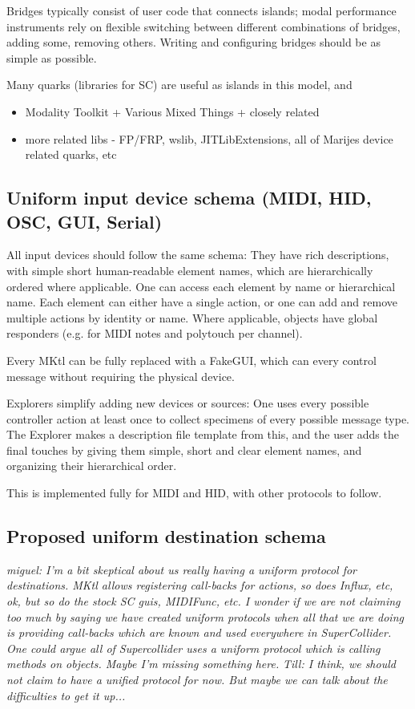\documentclass{article}
\begin{document}
Bridges typically consist of user code that connects islands; modal performance instruments rely on flexible switching between different combinations of bridges, adding some, removing others. Writing and configuring bridges should be as simple as possible. 

Many quarks (libraries for SC) are useful as islands in this model, and 

\begin{itemize}
	\item Modality Toolkit + Various Mixed Things + closely related
	\item more related libs - FP/FRP, wslib, JITLibExtensions, 
		all of Marijes device related quarks, etc 
\end{itemize}

\subsection{ Uniform input device schema (MIDI, HID, OSC, GUI, Serial) }

All input devices should follow the same schema: 
They have rich descriptions, with simple short human-readable element names, which are hierarchically ordered where applicable. 
One can access each element by name or hierarchical name.
Each element can either have a single action, or one can add and remove multiple actions by identity or name.
Where applicable, objects have global responders (e.g. for MIDI notes and polytouch per channel). 

Every MKtl can be fully replaced with a FakeGUI, which can every control message without requiring the physical device.

Explorers simplify adding new devices or sources: 
One uses every possible controller action at least once to collect specimens of every possible message type. 
The Explorer makes a description file template from this, and the user adds the final touches by giving them simple, short and clear element names, and organizing their hierarchical order.

This is implemented fully for MIDI and HID, with other protocols to follow.

\subsection{Proposed uniform destination schema}

\emph{ miguel: I'm a bit skeptical about us really having a uniform protocol for destinations. MKtl allows registering call-backs for actions, so does Influx, etc, ok, but so do the stock SC guis, MIDIFunc, etc.  I wonder if we are not claiming too much by saying we have created uniform protocols when all that we are doing is providing call-backs which are known and used everywhere in SuperCollider. One could argue all of Supercollider uses a uniform protocol which is calling methods on objects. Maybe I'm missing something here.
}
\emph{Till: I think, we should not claim to have a unified protocol for now. But maybe we can talk about the difficulties to get it up...}
 
\end{document}
